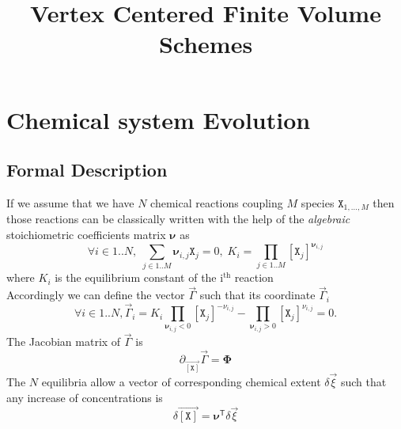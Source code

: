 \documentclass[aps,twocolumn]{revtex4}
\newcommand{\myconc}[1]{\left\lbrack #1 \right\rbrack}
\newcommand{\mychem}[1]{{\mathtt{#1}}}
\newcommand{\species}{\mychem{X}}
\newcommand{\mymat}[1]{\boldsymbol{#1}}
\newcommand{\mytrn}[1]{{#1}^{\mathsf{T}}}
\newcommand{\myvec}[1]{\overrightarrow{#1}}
\newcommand{\vecX}{\myvec{\myconc{\mychem{X}}}}
\begin{document}
\title{Vertex Centered Finite Volume Schemes}

\maketitle

\section{Chemical system Evolution}
\subsection{Formal Description}
If we assume that we have $N$ chemical reactions coupling $M$ species $\species_{1,\ldots,M}$ then those reactions can be classically written with the help
of the \textit{algebraic} stoichiometric coefficients matrix $\mymat{\nu}$ as
\begin{equation}
	\label{eq:Ki}
	\forall i \in 1..N, \; \sum_{j\in1..M} \mymat{\nu}_{i,j} \species_j = 0, \; K_i=\prod_{j\in1..M} \myconc{\species_j}^{\mymat{\nu}_{i,j}}
\end{equation}
where $K_i$ is the equilibrium constant of the i$^{\text{th}}$ reaction\\
Accordingly we can define the vector $\vec{\Gamma}$ such that its coordinate $\vec{\Gamma}_i$
\begin{equation}
	\label{eq:Gamma}
	\forall i \in 1..N, \vec{\Gamma}_i = K_i \prod_{\mymat{\nu}_{i,j}<0} \myconc{\species_j}^{-\nu_{i,j}} - \prod_{\mymat{\nu}_{i,j}>0} \myconc{\species_j}^{\nu_{i,j}} = 0.
\end{equation}
The Jacobian matrix of $\vec{\Gamma}$ is
\begin{equation}
	\partial_{\vecX} \vec{\Gamma} = \mymat{\Phi}
\end{equation}
The $N$ equilibria allow a vector of corresponding chemical extent $\delta\vec{\xi}$ such that any increase of concentrations is
\begin{equation}
	\delta\vecX = \mytrn{\mymat{\nu}} \delta\vec{\xi}
\end{equation}
\end{document}
